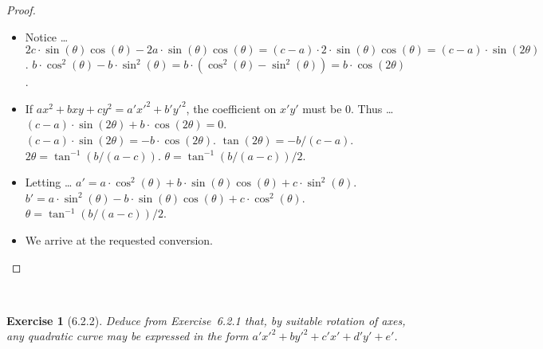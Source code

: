 \documentclass[12pt]{article}
\newcommand{\XB}{\color{black}}
\newcommand{\XBB}{\color{blue}}
\newcommand{\ds}{\displaystyle}
\theoremstyle{plain}
\newtheorem{ex}{Exercise}
\begin{document}
\begin{proof}
  \newpage

  \begin{itemize}
    \item Notice \dots
    \subitem $ \ds 2c \cdot \sin(\theta) \cos(\theta) - 2a \cdot \sin(\theta) \cos(\theta) = (c - a) \cdot 2 \cdot \sin(\theta) \cos(\theta) = (c - a) \cdot \sin(2\theta) $.
    \subitem $ \ds b \cdot \cos^{2}(\theta) - b \cdot \sin^{2}(\theta) = b \cdot ( \cos^{2}(\theta) - \sin^{2}(\theta) ) = b \cdot \cos(2\theta) $.
    \item If $ \ds ax^{2} + bxy + cy^{2} = a'x'^{2} + b'y'^{2} $, the coefficient on $ x'y' $ must be $ 0 $. Thus \dots
    \subitem $ \ds (c - a) \cdot \sin(2\theta) + b \cdot \cos(2\theta) = 0 $.
    \subitem $ \ds (c - a) \cdot \sin(2\theta) = - b \cdot \cos(2\theta) $.
    \subitem $ \ds \tan(2\theta) = - b / (c - a) $.
    \subitem $ \ds 2\theta =  \tan^{-1}(b / (a - c)) $.
    \subitem $ \ds \theta =  \tan^{-1}(b / (a - c)) / 2 $.
    \item Letting \dots
    \subitem $ \ds a' = a \cdot \cos^{2}(\theta) + b \cdot \sin(\theta) \cos(\theta) + c \cdot \sin^{2}(\theta) $.
    \subitem $ \ds b' = a \cdot \sin^{2}(\theta) - b \cdot \sin(\theta) \cos(\theta) + c \cdot \cos^{2}(\theta) $.
    \subitem $ \ds \theta =  \tan^{-1}(b / (a - c)) / 2 $.
    \item We arrive at the requested conversion.
  \end{itemize}

\end{proof}

\newpage


\XBB\hrulefill\XB \\
\begin{ex} [6.2.2]
  Deduce from Exercise~6.2.1 that, by suitable rotation of axes, any quadratic curve may be expressed in the form $ a'x'^{2} + by'^{2} + c'x' + d'y' + e' $.
\end{ex}
\XBB\hrulefill\XB \\
\end{document}
